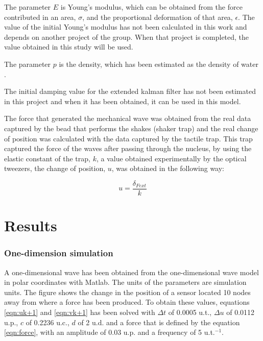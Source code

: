 \documentclass[12pt, a4paper]{article} %
\begin{document}
The parameter $E$ is Young's modulus, which can be obtained from the force contributed in an area, $\sigma$, and the proportional deformation of that area, $\epsilon$. The value of the initial Young's modulus has not been calculated in this work and depends on another project of the group. When that project is completed, the value obtained in this study will be used.

The parameter $p$ is the density, which has been estimated as the density of water \cite{patterson1994measurement}. 

The initial damping value for the extended kalman filter has not been estimated in this project and when it has been obtained, it can be used in this model.

The force that generated the mechanical wave was obtained from the real data captured by the bead that performs the shakes (shaker trap) and the real change of position was calculated with the data captured by the tactile trap. This trap captured the force of the waves after passing through the nucleus, by using the elastic constant of the trap, $k$, a value obtained experimentally by the optical tweezers, the change of position, $u$, was obtained in the following way:

\begin{equation} \label{eqn:real_desp}
	u = \frac{\delta_{Fext}}{k}
\end{equation}

\newpage


\section{Results}

\subsubsection{One-dimension simulation}

\setlength{\parskip}{0mm}

A one-dimensional wave has been obtained from the one-dimensional wave model in polar coordinates with Matlab. The units of the parameters are simulation units. The figure shows the change in the position of a sensor located 10 nodes away from where a force has been produced.  To obtain these values, equations \ref{eqn:uk+1} and \ref{eqn:vk+1} has been solved with $\Delta t$ of 0.0005 u.t., $\Delta u$ of 0.0112 u.p., $c$ of 0.2236 u.c., $d$ of 2 u.d. and a force that is defined by the equation \ref{eqn:force}, with an amplitude of 0.03 u.p. and a frequency of 5 u.t.$^{-1}$.
\end{document}
